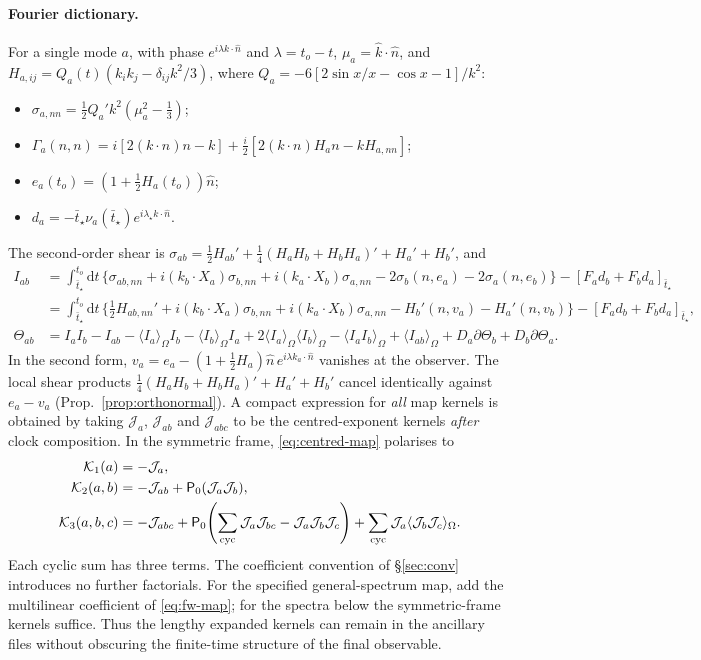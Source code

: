 \documentclass[11pt]{article}
\theoremstyle{definition}
\theoremstyle{remark}
\newcommand{\nh}{\hat n}
\newcommand{\dd}{\mathrm{d}}
\newcommand{\sky}[1]{\langle #1\rangle_{\Omega}}
\begin{document}
\paragraph{Fourier dictionary.} For a single mode $a$, with phase $e^{i\lambda k\cdot\nh}$ and
$\lambda=t_o-t$, $\mu_a=\hat k\cdot\nh$, and
$H_{a,ij}=Q_a(t)(k_ik_j-\delta_{ij}k^2/3)$, where
$Q_a=-6[2\sin x/x-\cos x-1]/k^2$:
\begin{itemize}
\item $\sigma_{a,nn}=\frac12Q_a'k^2(\mu_a^2-\frac13)$;
\item $\Gamma_a(n,n)=i[2(k\cdot n)n-k]+\frac i2[2(k\cdot n)H_an-kH_{a,nn}]$;
\item $e_a(t_o)=(1+\frac12H_a(t_o))\nh$;
\item $d_a=-\bar t_\star\nu_a(\bar t_\star)e^{i\lambda_\star k\cdot\nh}$.
\end{itemize}
The second-order shear is
$\sigma_{ab}=\frac12H_{ab}'+\frac14(H_aH_b+H_bH_a)'+H_a'+H_b'$, and
\begin{align*}
I_{ab}&=\int_{\bar t_\star}^{t_o}\!\dd t\,\big\{\sigma_{ab,nn}+i(k_b\!\cdot\!X_a)\sigma_{b,nn}+i(k_a\!\cdot\!X_b)\sigma_{a,nn}-2\sigma_b(n,e_a)-2\sigma_a(n,e_b)\big\}-[F_ad_b+F_bd_a]_{\bar t_\star}\\
&=\int_{\bar t_\star}^{t_o}\!\dd t\,\big\{\tfrac12H_{ab,nn}'+i(k_b\!\cdot\!X_a)\sigma_{b,nn}+i(k_a\!\cdot\!X_b)\sigma_{a,nn}-H_b'(n,v_a)-H_a'(n,v_b)\big\}-[F_ad_b+F_bd_a]_{\bar t_\star},\\
\Theta_{ab}&=I_aI_b-I_{ab}-\sky{I_a}I_b-\sky{I_b}I_a+2\sky{I_a}\sky{I_b}-\sky{I_aI_b}+\sky{I_{ab}}+D_a\partial\Theta_b+D_b\partial\Theta_a .
\end{align*}
In the second form, $v_a=e_a-(1+\frac12H_a)\nh\,e^{i\lambda k_a\cdot\nh}$ vanishes at the observer.
The local shear products $\frac14(H_aH_b+H_bH_a)'+H_a'+H_b'$ cancel identically against
$e_a-v_a$ (Prop.~\ref{prop:orthonormal}).
A compact expression for \emph{all} map kernels is obtained by taking $\mathcal J_a$,
$\mathcal J_{ab}$ and $\mathcal J_{abc}$ to be the centred-exponent kernels \emph{after}
clock composition. In the symmetric frame, \eqref{eq:centred-map} polarises to
\begin{equation}\label{eq:compact-map-kernels}
\begin{aligned}
\mathcal K_1(a)&=-\mathcal J_a,\\
\mathcal K_2(a,b)&=-\mathcal J_{ab}+\mathsf P_0(\mathcal J_a\mathcal J_b),\\
\mathcal K_3(a,b,c)&=-\mathcal J_{abc}
+\mathsf P_0\!\left(\sum_{\rm cyc}\mathcal J_a\mathcal J_{bc}
-\mathcal J_a\mathcal J_b\mathcal J_c\right)
+\sum_{\rm cyc}\mathcal J_a\sky{\mathcal J_b\mathcal J_c}.
\end{aligned}
\end{equation}
Each cyclic sum has three terms. The coefficient convention of \S\ref{sec:conv} introduces
no further factorials. For the specified general-spectrum map, add the multilinear
coefficient of \eqref{eq:fw-map}; for the spectra below the symmetric-frame kernels suffice.
Thus the lengthy expanded kernels can remain in the ancillary files without obscuring the
finite-time structure of the final observable.
\end{document}

